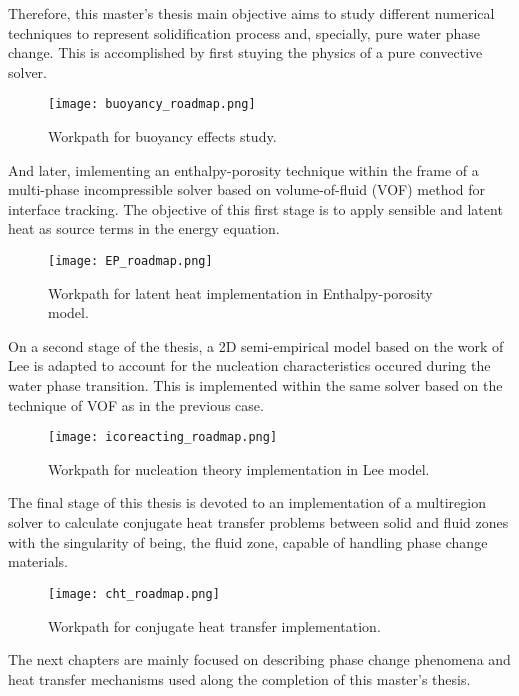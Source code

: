 \noindent Therefore, this master's thesis main objective aims to study different numerical techniques to represent solidification process and, specially, pure water phase change. This is accomplished by first stuying the physics of a pure convective solver.
\begin{figure}[h!]
	\centering
	\texttt{[image: buoyancy\_roadmap.png]}
	\caption{Workpath for buoyancy effects study.} 
	\label{1.1fig}
\end{figure}
\clearpage
\noindent And later, imlementing an enthalpy-porosity technique within the frame of a multi-phase incompressible solver based on volume-of-fluid (VOF) method for interface tracking. The objective of this first stage is to apply sensible and latent heat as source terms in the energy equation. 
\begin{figure}[h!]
	\centering
	\texttt{[image: EP\_roadmap.png]}
	\caption{Workpath for latent heat implementation in Enthalpy-porosity model.} 
	\label{1.2fig}
\end{figure}
\newline
On a second stage of the thesis, a 2D semi-empirical model based on the work of Lee is adapted to account for the nucleation characteristics occured during the water phase transition. This is implemented within the same solver based on the technique of VOF as in the previous case.
\begin{figure}[h!]
	\centering
	\texttt{[image: icoreacting\_roadmap.png]}
	\caption{Workpath for nucleation theory implementation in Lee model.} 
	\label{1.3fig}
\end{figure}
\newline
\noindent The final stage of this thesis is devoted to an implementation of a multiregion solver to calculate conjugate heat transfer problems between solid and fluid zones with the singularity of being, the fluid zone, capable of handling phase change materials. 
\clearpage
\begin{figure}[h!]
	\centering
	\texttt{[image: cht\_roadmap.png]}
	\caption{Workpath for conjugate heat transfer implementation.} 
	\label{1.4fig}
\end{figure}

\noindent The next chapters are mainly focused on describing phase change phenomena and heat transfer mechanisms used along the completion of this master's thesis.


\clearpage
